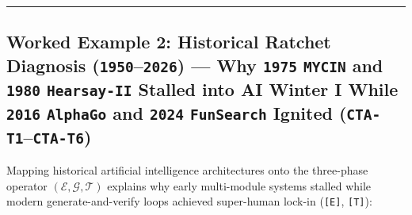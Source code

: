 \documentclass[10pt,letterpaper]{article}
\begin{document}
\begin{center}\rule{0.5\linewidth}{0.5pt}\end{center}

\subsection{\texorpdfstring{Worked Example 2: Historical Ratchet
Diagnosis (\texttt{1950}--\texttt{2026}) --- Why \texttt{1975}
\texttt{MYCIN} and \texttt{1980} \texttt{Hearsay-\allowbreak{}II} Stalled into AI
Winter I While \texttt{2016} \texttt{AlphaGo} and \texttt{2024}
\texttt{FunSearch} Ignited
(\texttt{CTA-T1}--\texttt{CTA-T6})}{Worked Example 2: Historical Ratchet Diagnosis (1950--2026) --- Why 1975 MYCIN and 1980 Hearsay-II Stalled into AI Winter I While 2016 AlphaGo and 2024 FunSearch Ignited (CTA-T1--CTA-T6)}}\label{worked-example-2-historical-ratchet-diagnosis-19502026-why-1975-mycin-and-1980-hearsay-ii-stalled-into-ai-winter-i-while-2016-alphago-and-2024-funsearch-ignited-cta-t1cta-t6}

Mapping historical artificial intelligence architectures onto the
three-phase operator \((\mathcal{E}, \mathcal{G}, \mathcal{T})\)
explains why early multi-module systems stalled while modern
generate-and-verify loops achieved super-human lock-in
(\texttt{{[}E{]}}, \texttt{{[}T{]}}):
\end{document}
